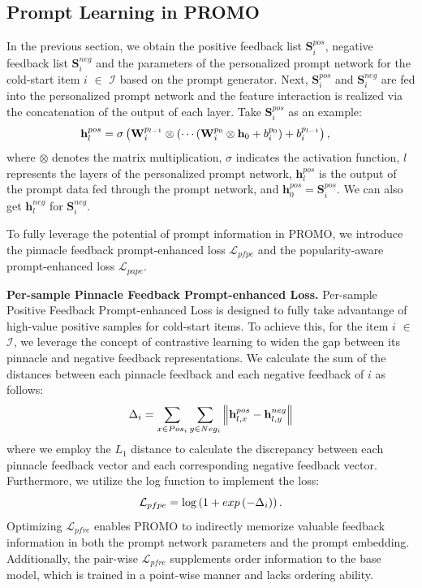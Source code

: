 \documentclass[sigconf]{acmart}
\newcommand{\sys}{\textsc{PROMO}\xspace}
\begin{document}
\subsection{Prompt Learning in \sys}
In the previous section, we obtain the positive feedback list $\mathbf{S}_i^{pos}$, negative feedback list $\mathbf{S}_i^{neg}$ and the parameters of the personalized prompt network for the cold-start item $i$ $\in$ $\mathcal{I}$ based on the prompt generator. 
Next, $\mathbf{S}_i^{pos}$ and $\mathbf{S}_i^{neg}$ are fed into the personalized prompt network and the feature interaction is realized via the concatenation of the output of each layer. Take $\mathbf{S}_i^{pos}$ as an example: 
\begin{equation}
\begin{aligned}
\small
\mathbf{h}_l^{pos} &= \sigma \left(\mathbf{W}_i^{p_{l - 1}} \otimes (\cdots (\mathbf{W}_i^{p_{0}} \otimes \mathbf{h}_{0} + b_i^{p_{0}}) + b_i^{p_{l - 1}}\right),
\end{aligned}
\end{equation}
where $\otimes$ denotes the matrix multiplication, $\sigma$ indicates the activation function, $l$ represents the layers of the personalized prompt network, $\mathbf{h}_l^{pos}$ is the output of the prompt data fed through the prompt network, and $\mathbf{h}_0^{pos} = \mathbf{S}_i^{pos}$. 
We can also get $\mathbf{h}_l^{neg}$ for $\mathbf{S}_i^{neg}$.

To fully leverage the potential of prompt information in \sys, we introduce the pinnacle feedback prompt-enhanced loss $\mathcal{L}_{pfpe}$ and the popularity-aware prompt-enhanced loss $\mathcal{L}_{pape}$.

\textbf{Per-sample Pinnacle Feedback Prompt-enhanced Loss.}
Per-sample Positive Feedback Prompt-enhanced Loss is designed to fully take advantange of high-value positive samples for cold-start items. 
To achieve this, for the item $i$ $\in$ $\mathcal{I}$, we leverage the concept of contrastive learning to widen the gap between its pinnacle and negative feedback representations. 
We calculate the sum of the distances between each pinnacle feedback and each negative feedback of $i$ as follows:
\begin{equation} \small
\Delta_i = \sum_{x \in Pos_i} \sum_{y \in Neg_i} \left\|\mathbf{h}_{l, x}^{pos} - \mathbf{h}_{l, y}^{neg}\right\|
\end{equation}
where we employ the $L_1$ distance to calculate the discrepancy between each pinnacle feedback vector and each corresponding negative feedback vector. 
Furthermore, we utilize the log function to implement the loss:
\begin{equation} \small
\mathcal{L}_{pfpe} = \log \left(1 + exp\left(- \Delta_i\right)\right).
\end{equation}
Optimizing $\mathcal{L}_{pfre}$ enables \sys to indirectly memorize valuable feedback information in both the prompt network parameters and the prompt embedding. 
Additionally, the pair-wise $\mathcal{L}_{pfre}$ supplements order information to the base model, which is trained in a point-wise manner and lacks ordering ability.
\end{document}
